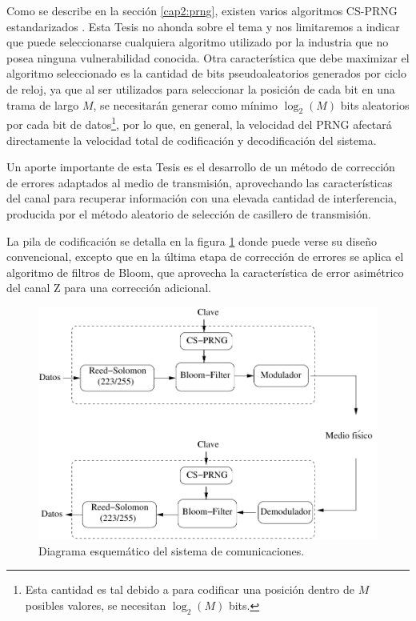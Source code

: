 Como se describe en la sección \ref{cap2:prng}, existen varios algoritmos CS-PRNG estandarizados \cite{gallagherfips}. Esta Tesis no ahonda sobre el tema y nos limitaremos a indicar que puede seleccionarse cualquiera algoritmo utilizado por la industria que no posea ninguna vulnerabilidad conocida. Otra característica que debe maximizar el algoritmo seleccionado es la cantidad de bits pseudoaleatorios generados por ciclo de reloj, ya que al ser utilizados para seleccionar la posición de cada bit en una trama de largo $M$, se necesitarán generar como mínimo $\log_2(M)$ bits aleatorios por cada bit de datos\footnote{Esta cantidad es tal debido a para codificar una posición dentro de $M$ posibles valores, se necesitan $\log_2(M)$ bits.}, por lo que, en general, la velocidad del PRNG afectará directamente la velocidad total de codificación y decodificación del sistema.

Un aporte importante de esta Tesis es el desarrollo de un método de corrección de errores adaptados al medio de transmisión, aprovechando las características del canal para recuperar información con una elevada cantidad de interferencia, producida por el método aleatorio de selección de casillero de transmisión.

La pila de codificación se detalla en la figura \ref{fig_comstack} donde puede verse su diseño convencional, excepto que en la última etapa de corrección de errores se aplica el algoritmo de filtros de Bloom, que aprovecha la característica de error asimétrico del canal Z para una corrección adicional.

\begin{figure}[t]
\centering
\includegraphics[width=5in]{graphs/Soft-stack3}
\caption{Diagrama esquemático del sistema de comunicaciones.}
\label{fig_comstack}
\end{figure}

